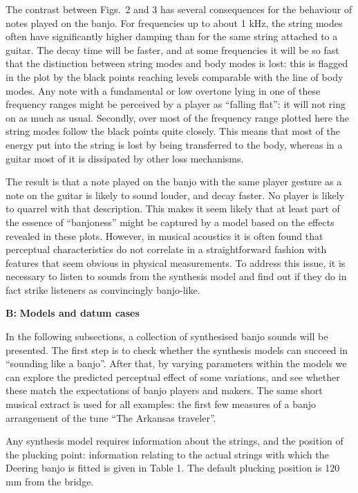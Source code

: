   The contrast between Figs.\ 2 and 3 has several consequences for the 
  behaviour of notes played on the banjo. For frequencies up to about 1 kHz, 
  the string modes often have significantly higher damping than for the same 
  string attached to a guitar. The decay time will be faster, and at some 
  frequencies it will be so fast that the distinction between string modes and 
  body modes is lost: this is flagged in the plot by the black points reaching 
  levels comparable with the line of body modes. Any note with a fundamental or 
  low overtone lying in one of these frequency ranges might be perceived by a 
  player as ``falling flat'': it will not ring on as much as usual. Secondly, 
  over most of the frequency range plotted here the string modes follow the 
  black points quite closely. This means that most of the energy put into the 
  string is lost by being transferred to the body, whereas in a guitar most of 
  it is dissipated by other loss mechanisms. 

  The result is that a note played on the banjo with the same player gesture as 
  a note on the guitar is likely to sound louder, and decay faster. No player 
  is likely to quarrel with that description. This makes it seem likely that at 
  least part of the essence of ``banjoness'' might be captured by a model based 
  on the effects revealed in these plots. However, in musical acoustics it is 
  often found that perceptual characteristics do not correlate in a 
  straightforward fashion with features that seem obvious in physical 
  measurements. To address this issue, it is necessary to listen to sounds from 
  the synthesis model and find out if they do in fact strike listeners as 
  convincingly banjo-like. 

  \textbf{B: }\textbf{Models and datum cases} 

  In the following subsections, a collection of synthesised banjo sounds will 
  be presented. The first step is to check whether the synthesis models can 
  succeed in ``sounding like a banjo''. After that, by varying parameters 
  within the models we can explore the predicted perceptual effect of some 
  variations, and see whether these match the expectations of banjo players and 
  makers. The same short musical extract is used for all examples: the first 
  few measures of a banjo arrangement of the tune ``The Arkansas traveler''. 

  Any synthesis model requires information about the strings, and the position 
  of the plucking point: information relating to the actual strings with which 
  the Deering banjo is fitted is given in Table 1. The default plucking 
  position is 120 mm from the bridge. 

